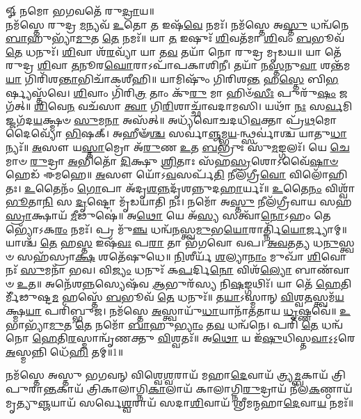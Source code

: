 {\small \closesection}



𑍐 𑌨𑌮𑍋 𑌭𑌗𑌵𑌤𑍇᳴ 𑌰𑍁\-\ul{𑌦𑍍𑌰𑌾}\-𑌯॥\\
 𑌨𑌮᳴𑌸𑍍𑌤𑍇 𑌰𑍁𑌦𑍍𑌰 \ul{𑌮}\-𑌨𑍍𑌯𑌵᳴ \ul{𑌉}\-𑌤𑍋 \ul{𑌤} 𑌇𑌷᳴\-\ul{𑌵𑍇} 𑌨𑌮𑌃᳴। 𑌨𑌮᳴𑌸𑍍𑌤𑍇 𑌅\-\ul{𑌸𑍍𑌤𑍁} 𑌧𑌨𑍍𑌵᳴𑌨𑍇 \ul{𑌬𑌾}\-𑌹𑍁𑌭𑍍𑌯𑌾᳴\-\ul{𑌮𑍁}\-𑌤 \ul{𑌤𑍇} 𑌨𑌮𑌃᳴॥ 𑌯𑌾 \ul{𑌤} 𑌇𑌷𑍁𑌃᳴ \ul{𑌶𑌿}\-𑌵𑌤᳴𑌮𑌾 \ul{𑌶𑌿}\-𑌵𑌂 \ul{𑌬}\-𑌭𑍂𑌵᳴ \ul{𑌤𑍇} 𑌧𑌨𑍁𑌃᳴। \ul{𑌶𑌿}\-𑌵𑌾 𑌶᳴\-\ul{𑌰}\-𑌵𑍍𑌯𑌾᳴ 𑌯𑌾 𑌤\-\ul{𑌵} 𑌤𑌯𑌾᳴ 𑌨𑍋 𑌰𑍁𑌦𑍍𑌰 𑌮𑍃𑌡𑌯॥ 𑌯𑌾 𑌤𑍇᳴ 𑌰𑍁𑌦𑍍𑌰 \ul{𑌶𑌿}\-𑌵𑌾 \ul{𑌤}\-𑌨𑍂𑌰\-\ul{𑌘𑍋}\-𑌰𑌾𑌽𑌪𑌾᳴𑌪𑌕𑌾𑌶𑌿𑌨𑍀। 𑌤𑌯𑌾᳴ 𑌨\-\ul{𑌸𑍍𑌤}\-𑌨𑍁\-\ul{𑌵𑌾} 𑌶𑌨𑍍𑌤᳴𑌮\-\ul{𑌯𑌾} 𑌗𑌿𑌰𑌿᳴𑌶\-\ul{𑌨𑍍𑌤𑌾}\-\-𑌭𑌿𑌚𑌾᳴𑌕𑌶𑍀𑌹𑌿॥ 𑌯𑌾𑌮𑌿𑌷𑍁𑌂᳴ 𑌗𑌿𑌰𑌿𑌶\-\ul{𑌨𑍍𑌤} 𑌹\-\ul{𑌸𑍍𑌤𑍇} 𑌬𑌿\-\ul{𑌭}\-𑌰𑍍𑌷𑍍𑌯𑌸𑍍𑌤᳴𑌵𑍇। \ul{𑌶𑌿}\-𑌵𑌾𑌂 𑌗𑌿᳴𑌰𑌿\-\ul{𑌤𑍍𑌰} 𑌤𑌾𑌂 𑌕𑍁᳴\-\ul{𑌰𑍁} 𑌮𑌾 𑌹𑌿𑍞᳴\-\ul{𑌸𑍀𑌃} 𑌪𑍁𑌰𑍁᳴\-\ul{𑌷𑌂} 𑌜𑌗᳴𑌤𑍍॥ \ul{𑌶𑌿}\-𑌵𑍇\-\ul{𑌨} 𑌵𑌚᳴𑌸𑌾 \ul{𑌤𑍍𑌵𑌾} 𑌗𑌿\-\ul{𑌰𑌿}\-𑌶𑌾𑌚𑍍𑌛𑌾᳴𑌵𑌦𑌾𑌮𑌸𑌿। 𑌯𑌥𑌾᳴ \ul{𑌨𑌃} 𑌸\-\ul{𑌰𑍍𑌵}\-𑌮𑌿𑌜𑍍𑌜𑌗᳴𑌦\-\ul{𑌯}\-𑌕𑍍𑌷𑍍𑌮𑍞 \ul{𑌸𑍁}\-𑌮\-\ul{𑌨𑌾} 𑌅𑌸᳴𑌤𑍍॥ 𑌅𑌧𑍍𑌯᳴𑌵𑍋𑌚𑌦𑌧𑌿\-\ul{𑌵}\-𑌕𑍍𑌤𑌾 𑌪𑍍𑌰᳴\-\ul{𑌥}\-𑌮𑍋 𑌦𑍈𑌵𑍍𑌯𑍋᳴ \ul{𑌭𑌿}\-𑌷𑌕𑍍।  𑌅𑌹𑍀𑍟᳴\-\ul{𑌶𑍍𑌚} 𑌸𑌰𑍍𑌵𑌾॑\-\ul{𑌞𑍍𑌜}\-𑌮𑍍𑌭\-\ul{𑌯}\--𑌨𑍍𑌥𑍍𑌸𑌰𑍍𑌵𑌾॑𑌶𑍍𑌚 𑌯𑌾𑌤𑍁\-\ul{𑌧𑌾}\-𑌨𑍍𑌯𑌃᳴॥ \ul{𑌅}\-𑌸𑍗 𑌯\-\ul{𑌸𑍍𑌤𑌾}\-𑌮𑍍𑌰𑍋 𑌅᳴\-\ul{𑌰𑍁}\-𑌣 \ul{𑌉}\-𑌤 \ul{𑌬}\-𑌭𑍍𑌰𑍁𑌃 𑌸𑍁᳴\-\ul{𑌮}\-𑌙𑍍𑌗𑌲𑌃᳴। 𑌯𑍇 \ul{𑌚𑍇}\-𑌮𑌾𑍞 \ul{𑌰𑍁}\-𑌦𑍍𑌰𑌾 \ul{𑌅}\-𑌭𑌿𑌤𑍋᳴ \ul{𑌦𑌿}\-𑌕𑍍𑌷𑍁 \ul{𑌶𑍍𑌰𑌿}\-𑌤𑌾𑌃 𑌸᳴𑌹\-\ul{𑌸𑍍𑌰}\-𑌶𑍋𑌽𑌵𑍈᳴\-\ul{𑌷𑌾}\-\-\ul{𑍞} 𑌹𑍇𑌡᳴ 𑌈𑌮𑌹𑍇॥ \ul{𑌅}\-𑌸𑍗 𑌯𑍋᳴𑌽\-\ul{𑌵}\-𑌸𑌰𑍍𑌪᳴\-\ul{𑌤𑌿} 𑌨𑍀𑌲᳴𑌗𑍍𑌰𑍀\-\ul{𑌵𑍋} 𑌵𑌿𑌲𑍋᳴𑌹𑌿𑌤𑌃। \ul{𑌉}\-𑌤𑍈𑌨𑌂᳴ \ul{𑌗𑍋}\-𑌪𑌾 𑌅᳴𑌦𑍃\-\ul{𑌶}\-\-\ul{𑌨𑍍𑌨}\-𑌦𑍃᳴𑌶𑌨𑍍𑌨𑍁𑌦\-\ul{𑌹𑌾}\-𑌰𑍍𑌯𑌃᳴॥ \ul{𑌉}\-𑌤𑍈\-\ul{𑌨𑌂} 𑌵𑌿𑌶𑍍𑌵𑌾᳴ \ul{𑌭𑍂}\-𑌤𑌾\-\ul{𑌨𑌿} 𑌸 \ul{𑌦𑍃}\-𑌷𑍍𑌟𑍋 𑌮𑍃᳴𑌡𑌯𑌾𑌤𑌿 𑌨𑌃। 𑌨𑌮𑍋᳴ 𑌅\-\ul{𑌸𑍍𑌤𑍁} 𑌨𑍀𑌲᳴𑌗𑍍𑌰𑍀𑌵𑌾𑌯 𑌸𑌹\-\ul{𑌸𑍍𑌰𑌾}\-𑌕𑍍𑌷𑌾𑌯᳴ \ul{𑌮𑍀}\-𑌢𑍁𑌷𑍇॑॥ 𑌅\-\ul{𑌥𑍋} 𑌯𑍇 𑌅᳴\-\ul{𑌸𑍍𑌯} 𑌸𑌤𑍍𑌵𑌾᳴\-\ul{𑌨𑍋}\-𑌽𑌹𑌂 𑌤𑍇𑌭𑍍𑌯𑍋᳴𑌽𑌕\-\ul{𑌰𑌂} 𑌨𑌮𑌃᳴। 𑌪𑍍𑌰 𑌮𑍁᳴\-\ul{𑌞𑍍𑌚} 𑌧𑌨𑍍𑌵᳴\-\ul{𑌨}\-𑌸𑍍𑌤𑍍𑌵\-\ul{𑌮𑍁}\-𑌭\-\ul{𑌯𑍋}\-𑌰𑌾𑌰𑍍𑌤𑍍𑌨𑌿᳴\-\ul{𑌯𑍋}\-𑌰𑍍𑌜𑍍𑌯𑌾𑌮𑍍॥ 𑌯𑌾𑌶𑍍𑌚᳴ \ul{𑌤𑍇} 𑌹\-\ul{𑌸𑍍𑌤} 𑌇𑌷᳴\-\ul{𑌵𑌃} 𑌪\-\ul{𑌰𑌾} 𑌤𑌾 𑌭᳴𑌗𑌵𑍋 𑌵𑌪। \ul{𑌅}\-\-\ul{𑌵}\-𑌤\-\ul{𑌤𑍍𑌯} 𑌧\-\ul{𑌨𑍁}\-𑌸𑍍𑌤𑍍𑌵𑍞 𑌸𑌹᳴𑌸𑍍𑌰𑌾\-\ul{𑌕𑍍𑌷} 𑌶𑌤𑍇᳴𑌷𑍁𑌧𑍇॥ \ul{𑌨𑌿}\-𑌶𑍀𑌰𑍍𑌯᳴ \ul{𑌶}\-𑌲𑍍𑌯𑌾\-\ul{𑌨𑌾𑌂} 𑌮𑍁𑌖𑌾᳴ \ul{𑌶𑌿}\-𑌵𑍋 𑌨𑌃᳴ \ul{𑌸𑍁}\-𑌮𑌨𑌾᳴ 𑌭𑌵। 𑌵𑌿\-\ul{𑌜𑍍𑌯𑌂} 𑌧𑌨𑍁𑌃᳴ 𑌕\-\ul{𑌪}\-𑌰𑍍𑌦𑌿\-\ul{𑌨𑍋} 𑌵𑌿𑌶᳴\-\ul{𑌲𑍍𑌯𑍋} 𑌬𑌾𑌣᳴𑌵𑌾𑍞 \ul{𑌉}\-𑌤॥
 𑌅𑌨𑍇᳴𑌶\-\ul{𑌨𑍍𑌨}\-\-𑌸𑍍𑌯𑍇𑌷᳴𑌵 \ul{𑌆}\-𑌭𑍁𑌰᳴𑌸𑍍𑌯 𑌨𑌿\-\ul{𑌷}\-𑌙𑍍𑌗𑌥𑌿𑌃᳴। 𑌯𑌾 𑌤𑍇᳴ \ul{𑌹𑍇}\-𑌤𑌿𑌰𑍍𑌮𑍀᳴𑌢𑍁𑌷𑍍𑌟\-\ul{𑌮} 𑌹𑌸𑍍𑌤𑍇᳴ \ul{𑌬}\-𑌭𑍂𑌵᳴ \ul{𑌤𑍇} 𑌧𑌨𑍁𑌃᳴॥ 𑌤\-\ul{𑌯𑌾}\-𑌽𑌸𑍍𑌮𑌾𑌨𑍍 \ul{𑌵𑌿}\-𑌶𑍍𑌵\-\ul{𑌤}\-𑌸𑍍𑌤𑍍𑌵𑌮᳴\-\ul{𑌯}\-𑌕𑍍𑌷𑍍𑌮\-\ul{𑌯𑌾} 𑌪𑌰𑌿᳴𑌬𑍍𑌭𑍁𑌜। 𑌨𑌮᳴𑌸𑍍𑌤𑍇 \ul{𑌅}\-𑌸𑍍𑌤𑍍𑌵𑌾𑌯𑍁᳴\-\ul{𑌧𑌾}\-𑌯𑌾𑌨𑌾᳴𑌤𑌤𑌾𑌯 \ul{𑌧𑍃}\-𑌷𑍍𑌣𑌵𑍇॑॥ \ul{𑌉}\-𑌭𑌾𑌭𑍍𑌯𑌾᳴\-\ul{𑌮𑍁}\-𑌤 \ul{𑌤𑍇} 𑌨𑌮𑍋᳴ \ul{𑌬𑌾}\-𑌹𑍁\-\ul{𑌭𑍍𑌯𑌾𑌂} 𑌤\-\ul{𑌵} 𑌧𑌨𑍍𑌵᳴𑌨𑍇। 𑌪𑌰𑌿᳴ \ul{𑌤𑍇} 𑌧𑌨𑍍𑌵᳴𑌨𑍋 \ul{𑌹𑍇}\-𑌤𑌿\-\ul{𑌰}\-𑌸𑍍𑌮𑌾𑌨𑍍𑌵𑍃᳴𑌣𑌕𑍍𑌤𑍁 \ul{𑌵𑌿}\-𑌶𑍍𑌵𑌤𑌃᳴॥ 𑌅\-\ul{𑌥𑍋} 𑌯 𑌇᳴\-\ul{𑌷𑍁}\-𑌧𑌿𑌸𑍍𑌤\-\ul{𑌵𑌾}\-𑌽॒𑌽॒𑌰𑍇 \ul{𑌅}\-𑌸𑍍𑌮𑌨𑍍𑌨𑌿 𑌧𑍇᳴\-\ul{𑌹𑌿} 𑌤𑌮𑍍॥1॥

 
\lbrack 𑌨𑌮᳴𑌸𑍍𑌤𑍇 𑌅𑌸𑍍𑌤𑍁 𑌭𑌗𑌵𑌨𑍍 𑌵𑌿𑌶𑍍𑌵𑍇\-\ul{𑌶𑍍𑌵}\-𑌰𑌾𑌯᳴ 𑌮𑌹𑌾\-\ul{𑌦𑍇}\-𑌵𑌾𑌯᳴ 𑌤𑍍𑌰𑍍𑌯\-\ul{𑌮𑍍𑌬}\-𑌕𑌾𑌯᳴ 𑌤𑍍𑌰𑌿𑌪𑍁𑌰𑌾\-\ul{𑌨𑍍𑌤}\-𑌕𑌾𑌯᳴ 𑌤𑍍𑌰𑌿𑌕𑌾\lbrack 𑌲𑌾\rbrack 𑌗𑍍𑌨𑌿\-\ul{𑌕𑌾}\-𑌲𑌾𑌯᳴ 𑌕𑌾𑌲𑌾𑌗𑍍𑌨𑌿\-\ul{𑌰𑍁}\-𑌦𑍍𑌰𑌾𑌯᳴ 𑌨𑍀𑌲\-\ul{𑌕}\-𑌣𑍍𑌠𑌾𑌯᳴ 𑌮𑍃𑌤𑍍𑌯𑍁\-\ul{𑌞𑍍𑌜}\-𑌯𑌾𑌯᳴ 𑌸𑌰𑍍𑌵𑍇\-\ul{𑌶𑍍𑌵}\-𑌰𑌾𑌯᳴ 𑌸𑌦𑌾\-\ul{𑌶𑌿}\-𑌵𑌾𑌯᳴ 𑌶𑍍𑌰𑍀𑌮𑌨𑍍𑌮𑌹𑌾\-\ul{𑌦𑍇}\-𑌵𑌾\-\ul{𑌯} 𑌨𑌮𑌃᳴॥\rbrack


